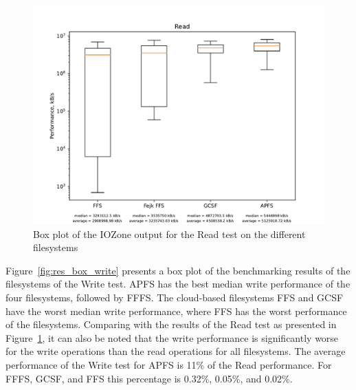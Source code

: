 \begin{figure}[!htb]
	\label{fig:res_box_read}
	\begin{center}
		\includegraphics[width=1.0\textwidth]{figures/benchmarking/Read_box.pdf}
	\end{center}
	\caption{Box plot of the IOZone output for the Read test on the different filesystems}
\end{figure}

Figure~\ref{fig:res_box_write} presents a box plot of the benchmarking results of the filesystems of the Write test. \gls{APFS} has the best median write performance of the four filesystems, followed by \gls{FFFS}. The cloud-based filesystems \gls{FFS} and \gls{GCSF} have the worst median write performance, where \gls{FFS} has the worst performance of the filesystems. Comparing with the results of the Read test as presented in Figure~\ref{fig:res_box_read}, it can also be noted that the write performance is significantly worse for the write operations than the read operations for all filesystems. The average performance of the Write test for \gls{APFS} is 11\% of the Read performance. For \gls{FFFS}, \gls{GCSF}, and \gls{FFS} this percentage is 0.32\%, 0.05\%, and 0.02\%.

